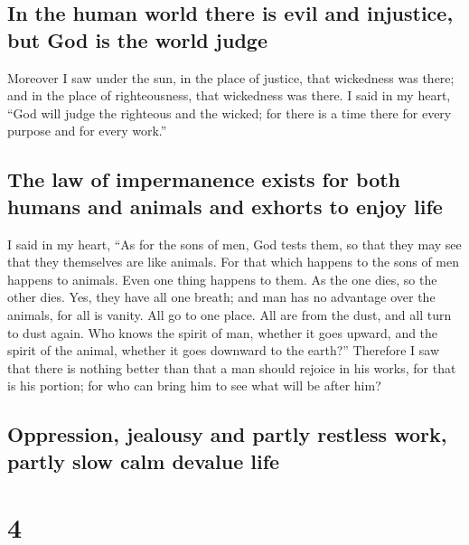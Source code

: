 \hypertarget{in-the-human-world-there-is-evil-and-injustice-but-god-is-the-world-judge}{%
\subsection{In the human world there is evil and injustice, but God is
the world
judge}\label{in-the-human-world-there-is-evil-and-injustice-but-god-is-the-world-judge}}

 Moreover I saw under the sun, in the place of justice,
that wickedness was there; and in the place of righteousness, that
wickedness was there.  I said in my heart, ``God will
judge the righteous and the wicked; for there is a time there for every
purpose and for every work.''

\hypertarget{the-law-of-impermanence-exists-for-both-humans-and-animals-and-exhorts-to-enjoy-life}{%
\subsection{The law of impermanence exists for both humans and animals
and exhorts to enjoy
life}\label{the-law-of-impermanence-exists-for-both-humans-and-animals-and-exhorts-to-enjoy-life}}

 I said in my heart, ``As for the sons of men, God tests
them, so that they may see that they themselves are like animals.
 For that which happens to the sons of men happens to
animals. Even one thing happens to them. As the one dies, so the other
dies. Yes, they have all one breath; and man has no advantage over the
animals, for all is vanity.  All go to one place. All are
from the dust, and all turn to dust again.  Who knows the
spirit of man, whether it goes upward, and the spirit of the animal,
whether it goes downward to the earth?''  Therefore I saw
that there is nothing better than that a man should rejoice in his
works, for that is his portion; for who can bring him to see what will
be after him?

\hypertarget{oppression-jealousy-and-partly-restless-work-partly-slow-calm-devalue-life}{%
\subsection{Oppression, jealousy and partly restless work, partly slow
calm devalue
life}\label{oppression-jealousy-and-partly-restless-work-partly-slow-calm-devalue-life}}

\hypertarget{section-3}{%
\section{4}\label{section-3}}

